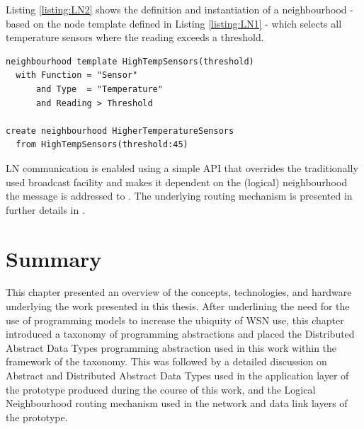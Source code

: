 Listing \ref{listing:LN2} shows the definition and
instantiation of a
neighbourhood - based on the node template defined in Listing \ref{listing:LN1}
- which selects all temperature sensors where the reading exceeds a threshold.
 
\begin{lstlisting}[frame=trbl, basewidth={0.55em, 0.6em}, captionpos=b, 
basicstyle=\ttfamily\footnotesize, breaklines, caption = Neighbourhood Definition and Instantiation, label = listing:LN2]  
neighbourhood template HighTempSensors(threshold)
  with Function = "Sensor" 
      and Type  = "Temperature" 
      and Reading > Threshold

create neighbourhood HigherTemperatureSensors
  from HighTempSensors(threshold:45)
\end{lstlisting}

LN communication is enabled using a simple API that overrides the
traditionally used broadcast facility and makes it dependent on the (logical)
neighbourhood the message is addressed to \cite{mottola_LN:2006}. The underlying routing mechanism is presented in further
details in \cite{mottola_LN:2006, mottola_LNScoping:2006}.

\section{Summary}

This chapter presented an overview of the concepts, technologies, and hardware
underlying the work presented in this thesis. After underlining the need for the
use of programming models to increase the ubiquity of WSN use, this chapter
introduced a taxonomy of programming abstractions and placed the Distributed
Abstract Data Types programming abstraction used in this work within the
framework of the taxonomy. This was followed by a detailed discussion on Abstract
and Distributed Abstract Data Types used in the application layer of the
prototype produced during the course of this work, and the Logical Neighbourhood
routing mechanism used in the network and data link layers of the prototype. 


  